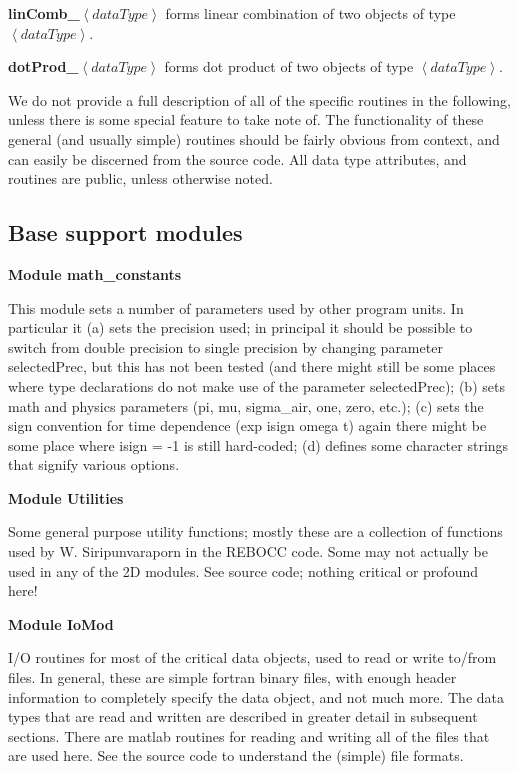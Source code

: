 \documentclass[12pt]{article}
\begin{document}
\noindent
{\bf linComb\_}$\left< dataType \right>$ forms linear combination of two
objects of type $\left< dataType \right>$.

\vspace{10pt}

\noindent
{\bf dotProd\_}$\left< dataType \right>$ forms dot product of two
objects of type $\left< dataType \right>$.

\vspace{10pt}

We do not provide a full description of all of the
specific routines in the following, unless there is
some special feature to take note of.   The functionality
of these general (and usually simple) routines should be fairly
obvious from context, and can easily be discerned from
the source code.  All data type attributes, and
routines are public, unless otherwise noted.

\subsection{Base support modules}

\noindent
{\bf Module math\_constants}

This module sets a number of parameters used
by other program units.  In particular it
(a) sets the precision used; in principal
it should be possible to switch from double precision
to single precision by changing parameter selectedPrec,
but this has not been tested (and there might still be
some places where type declarations do not make use
of the parameter selectedPrec); (b) sets math and
physics parameters (pi, mu, sigma\_air, one, zero, etc.); 
(c) sets the sign convention for time dependence (exp isign omega t)
again there might be some place where isign = -1 is
still hard-coded; (d) defines some character strings
that signify various options.

\vspace{10pt}

\noindent
{\bf Module Utilities}

Some general purpose utility functions; mostly these
are a collection of functions used by W. Siripunvaraporn
in the REBOCC code.  Some may not actually be used in any
of the 2D modules.  See source code; nothing critical or
profound here!

\vspace{10pt}

\noindent
{\bf Module IoMod}

I/O routines for most of the critical data objects,
used to read or write to/from files.  In general,
these are simple fortran binary files, with enough
header information to completely specify the data object,
and not much more.  The data types that are read and written
are described in greater detail in subsequent sections.
There are matlab routines for reading and writing
all of the files that are used here.  See the source
code to understand the (simple) file formats.
\end{document}
